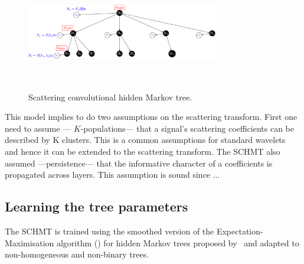 \documentclass{article}
\begin{document}
    \begin{figure}[h]
      \begin{center}
				\includegraphics[width=3.3in, height=2in, keepaspectratio]{scat_HMT_crop.pdf}
				\caption{Scattering convolutional hidden Markov tree.}
				\label{fig:SCHMT 1}
      \end{center}
    \end{figure}
    
    This model implies to do two assumptions on the scattering transform. First one need to assume --- $K$-populations--- that a signal’s scattering coefficients can be described by K clusters. This is a common assumptions for standard wavelets~\citep{kingsbury2001complex} and hence it can be extended to the scattering transform. The SCHMT also assumed ---persistence--- that the informative character of a coefficients is propagated across layers. This assumption is sound since ...

  \subsection{Learning the tree parameters}
    \label{subsec:SCHMT/Learning}    

    The SCHMT is trained using the smoothed version of the Expectation-Maximisation algorithm (\cite{someone}) for hidden Markov trees proposed by~\citep{Durand} and adapted to non-homogeneous and non-binary trees.
    
\end{document}
